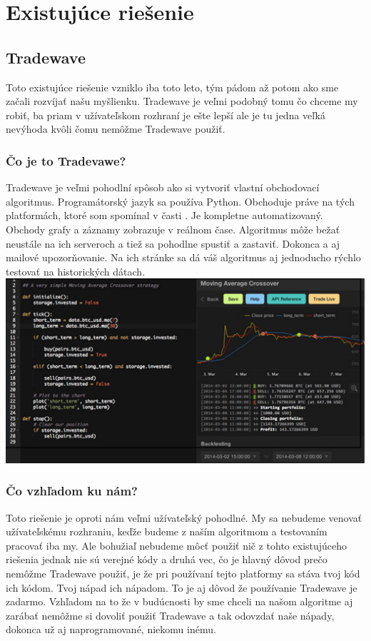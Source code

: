 \section{Existujúce riešenie} 
\subsection{Tradewave} 
Toto existujúce riešenie vzniklo iba toto leto, tým pádom až potom ako sme začali rozvíjať našu myšlienku. Tradewave je veľmi podobný tomu čo chceme my robiť, ba priam v užívateľskom rozhraní je ešte lepší ale je tu jedna veľká nevýhoda kvôli čomu nemôžme Tradewave použiť.  
\subsubsection{Čo je to Tradevawe?} 
Tradewave je veľmi pohodlní spôsob ako si vytvoriť vlastní obchodovací algoritmus. Programátorský jazyk sa používa Python. Obchoduje práve na tých platformách, ktoré som spomínal v časti . Je kompletne automatizovaný. Obchody grafy a záznamy zobrazuje v reálnom čase. Algoritmus môže bežať neustále na ich serveroch a tiež sa pohodlne spustiť a zastaviť. Dokonca a aj mailové upozorňovanie. Na ich stránke sa dá váš algoritmus aj jednoducho rýchlo testovať na historických dátach.  \cite{Tw} 
\includegraphics[width=1\textwidth]{trade} 
\subsubsection{Čo vzhľadom ku nám?} 
Toto riešenie je oproti nám veľmi užívateľský pohodlné. My sa nebudeme venovať užívateľskému rozhraniu, keďže budeme z naším algoritmom a testovaním  pracovať iba my. Ale bohužiaľ nebudeme môcť použiť nič z tohto existujúceho riešenia jednak nie sú verejné kódy a druhá vec, čo je hlavný dôvod prečo nemôžme Tradewave použiť, je že pri používaní tejto platformy sa stáva tvoj kód ich kódom. Tvoj nápad ich nápadom. To je aj dôvod že používanie Tradewave je zadarmo. Vzhľadom na to že v budúcnosti by sme chceli na našom algoritme aj zarábať nemôžme si dovoliť použiť Tradewave a tak odovzdať naše nápady, dokonca už aj naprogramované, niekomu inému. 
